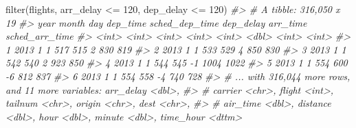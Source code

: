 \documentclass[
]{book}
\newenvironment{Shaded}{\begin{snugshade}}{\end{snugshade}}
\newcommand{\CommentTok}[1]{\textcolor[rgb]{0.56,0.35,0.01}{\textit{#1}}}
\newcommand{\DecValTok}[1]{\textcolor[rgb]{0.00,0.00,0.81}{#1}}
\newcommand{\FunctionTok}[1]{\textcolor[rgb]{0.00,0.00,0.00}{#1}}
\newcommand{\NormalTok}[1]{#1}
\newcommand{\SpecialCharTok}[1]{\textcolor[rgb]{0.00,0.00,0.00}{#1}}
\begin{document}
\begin{Shaded}
\begin{Highlighting}[]
\FunctionTok{filter}\NormalTok{(flights, arr\_delay }\SpecialCharTok{\textless{}=} \DecValTok{120}\NormalTok{, dep\_delay }\SpecialCharTok{\textless{}=} \DecValTok{120}\NormalTok{)}
\CommentTok{\#\textgreater{} \# A tibble: 316,050 x 19}
\CommentTok{\#\textgreater{}    year month   day dep\_time sched\_dep\_time dep\_delay arr\_time sched\_arr\_time}
\CommentTok{\#\textgreater{}   \textless{}int\textgreater{} \textless{}int\textgreater{} \textless{}int\textgreater{}    \textless{}int\textgreater{}          \textless{}int\textgreater{}     \textless{}dbl\textgreater{}    \textless{}int\textgreater{}          \textless{}int\textgreater{}}
\CommentTok{\#\textgreater{} 1  2013     1     1      517            515         2      830            819}
\CommentTok{\#\textgreater{} 2  2013     1     1      533            529         4      850            830}
\CommentTok{\#\textgreater{} 3  2013     1     1      542            540         2      923            850}
\CommentTok{\#\textgreater{} 4  2013     1     1      544            545        {-}1     1004           1022}
\CommentTok{\#\textgreater{} 5  2013     1     1      554            600        {-}6      812            837}
\CommentTok{\#\textgreater{} 6  2013     1     1      554            558        {-}4      740            728}
\CommentTok{\#\textgreater{} \# ... with 316,044 more rows, and 11 more variables: arr\_delay \textless{}dbl\textgreater{},}
\CommentTok{\#\textgreater{} \#   carrier \textless{}chr\textgreater{}, flight \textless{}int\textgreater{}, tailnum \textless{}chr\textgreater{}, origin \textless{}chr\textgreater{}, dest \textless{}chr\textgreater{},}
\CommentTok{\#\textgreater{} \#   air\_time \textless{}dbl\textgreater{}, distance \textless{}dbl\textgreater{}, hour \textless{}dbl\textgreater{}, minute \textless{}dbl\textgreater{}, time\_hour \textless{}dttm\textgreater{}}


\end{Highlighting}
\end{Shaded}
\end{document}
